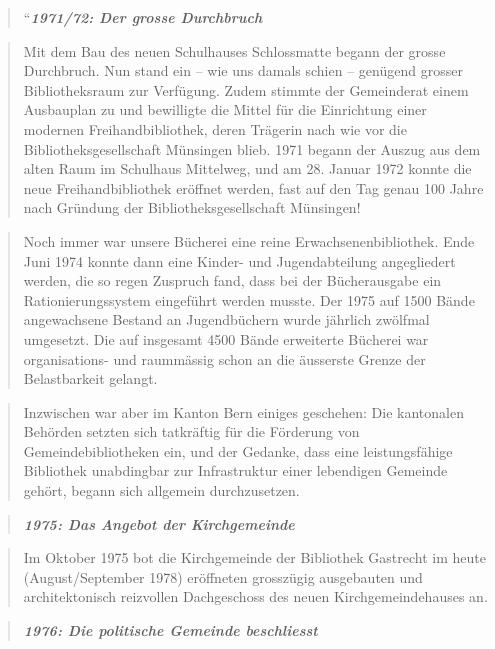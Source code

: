 \documentclass[a4paper,
fontsize=11pt,
oneside,
numbers=noperiodatend,
parskip=half-,
bibliography=totoc,
final
]{scrartcl}
\begin{document}
\begin{quote}
``\textbf{\emph{1971/72: Der grosse Durchbruch}}
\end{quote}

\begin{quote}
Mit dem Bau des neuen Schulhauses Schlossmatte begann der grosse
Durchbruch. Nun stand ein -- wie uns damals schien -- genügend grosser
Bibliotheksraum zur Verfügung. Zudem stimmte der Gemeinderat einem
Ausbauplan zu und bewilligte die Mittel für die Einrichtung einer
modernen Freihandbibliothek, deren Trägerin nach wie vor die
Bibliotheksgesellschaft Münsingen blieb. 1971 begann der Auszug aus dem
alten Raum im Schulhaus Mittelweg, und am 28. Januar 1972 konnte die
neue Freihandbibliothek eröffnet werden, fast auf den Tag genau 100
Jahre nach Gründung der Bibliotheksgesellschaft Münsingen!
\end{quote}

\begin{quote}
Noch immer war unsere Bücherei eine reine Erwachsenenbibliothek. Ende
Juni 1974 konnte dann eine Kinder- und Jugendabteilung angegliedert
werden, die so regen Zuspruch fand, dass bei der Bücherausgabe ein
Rationierungssystem eingeführt werden musste. Der 1975 auf 1500 Bände
angewachsene Bestand an Jugendbüchern wurde jährlich zwölfmal umgesetzt.
Die auf insgesamt 4500 Bände erweiterte Bücherei war organisations- und
raummässig schon an die äusserste Grenze der Belastbarkeit gelangt.
\end{quote}

\begin{quote}
Inzwischen war aber im Kanton Bern einiges geschehen: Die kantonalen
Behörden setzten sich tatkräftig für die Förderung von
Gemeindebibliotheken ein, und der Gedanke, dass eine leistungsfähige
Bibliothek unabdingbar zur Infrastruktur einer lebendigen Gemeinde
gehört, begann sich allgemein durchzusetzen.
\end{quote}

\begin{quote}
\textbf{\emph{1975: Das Angebot der Kirchgemeinde}}
\end{quote}

\begin{quote}
Im Oktober 1975 bot die Kirchgemeinde der Bibliothek Gastrecht im heute
(August/September 1978) eröffneten grosszügig ausgebauten und
architektonisch reizvollen Dachgeschoss des neuen Kirchgemeindehauses
an.
\end{quote}

\begin{quote}
\textbf{\emph{1976: Die politische Gemeinde beschliesst}}
\end{quote}
\end{document}
